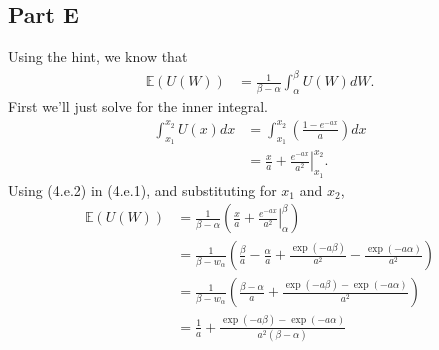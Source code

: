 \documentclass{article}
\begin{document}
\subsection*{Part E}
Using the hint, we know that
\begin{align*}
	\mathbb{E}(U(W)) &= \frac{1}{\beta - \alpha}\int_{\alpha}^{\beta}U(W)dW.\tag{4.e.1}
\end{align*}
First we'll just solve for the inner integral.
\begin{align*}
	\int_{x_1}^{x_2}U(x)dx &= \int_{x_1}^{x_2}\left(\frac{1 - e^{-ax}}{a}\right)dx\\
	&=\left.\frac{x}{a} + \frac{e^{-ax}}{a^2}\right|_{x_1}^{x_2}.\tag{4.e.2}
\end{align*}
Using (4.e.2) in (4.e.1), and substituting for $x_1$ and $x_2$, 
\begin{align*}
	\mathbb{E}(U(W)) &= \frac{1}{\beta - \alpha}\left(\left.\frac{x}{a} + \frac{e^{-ax}}{a^2}\right|_{\alpha}^{\beta}\right)\\
	&=\frac{1}{\beta - w_{\alpha}}\left(\frac{\beta}{a} - \frac{\alpha}{a} + \frac{\exp(-a\beta)}{a^2} - \frac{\exp(-a\alpha)}{a^2}\right)\\
	&=\frac{1}{\beta - w_{\alpha}}\left(\frac{\beta - \alpha}{a} + \frac{\exp(-a\beta) - \exp(-a\alpha)}{a^2}\right)\\
	&= \frac{1}{a} + \frac{\exp(-a\beta) - \exp(-a\alpha)}{a^2(\beta - \alpha)}
\end{align*}
\end{document}
